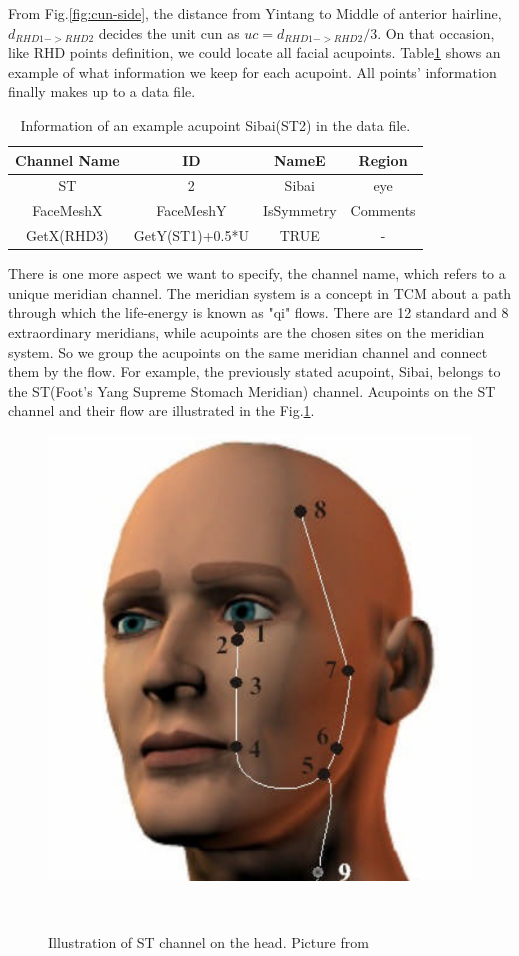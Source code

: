 From Fig.\ref{fig:cun-side}, the distance from Yintang to Middle of anterior hairline, $d_{RHD1->RHD2}$ decides the unit cun as $uc=d_{RHD1->RHD2}/3$. On that occasion, like RHD points definition, we could locate all facial acupoints. Table\ref{tab:acu-info} shows an example of what information we keep for each acupoint. All points’ information finally makes up to a data file.

\begin{table}
\begin{center}
\begin{tabular}{c|c|c|c}
\hline
Channel Name & ID & NameE & Region \\
\hline
ST& 2& Sibai & eye\\
\hline
\hline
FaceMeshX & FaceMeshY & IsSymmetry & Comments \\
\hline
GetX(RHD3)& GetY(ST1)+0.5*U & TRUE & - \\
\hline
\end{tabular}
\end{center}
\caption {Information of an example acupoint Sibai(ST2) in the data file.} 
\label{tab:acu-info} 
\end{table}
There is one more aspect we want to specify, the channel name, which refers to a unique meridian channel. The meridian system is a concept in TCM about a path through which the life-energy is known as "qi" flows. There are 12 standard and 8 extraordinary meridians, while acupoints are the chosen sites on the meridian system. So we group the acupoints on the same meridian channel and connect them by the flow. For example, the previously stated acupoint, Sibai, belongs to the ST(Foot's Yang Supreme Stomach Meridian) channel. Acupoints on the ST channel and their flow are illustrated in the Fig.\ref{fig:st_channel}.
\begin{figure}
\centering
  \includegraphics[width=0.5\columnwidth]{figures/st.png}
  \caption{Illustration of ST channel on the head. Picture from \protect\cite{stchannel} }~\label{fig:st_channel}
\end{figure}


